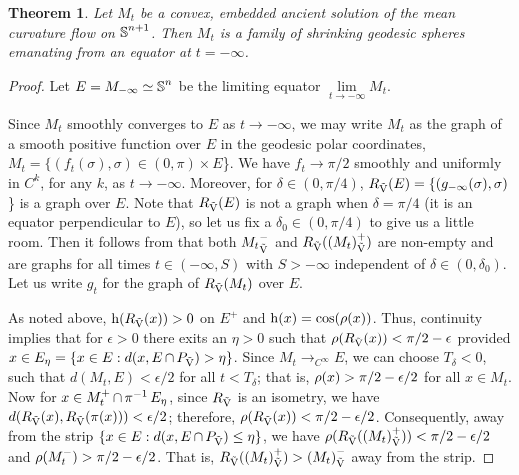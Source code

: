 \documentclass{amsart}
\newtheorem{theorem}{Theorem}
\theoremstyle{definition}
\theoremstyle{remark}
\numberwithin{equation}{section}
\begin{document}
\begin{theorem}
Let \(M_t\) be a convex, embedded ancient solution of the mean curvature flow on \(\operatorname{\mathbb{S}}^{n+1}\). Then \(M_t\) is a family of shrinking geodesic spheres emanating from an equator at \(t=-\infty\).
\end{theorem}
\begin{proof}
Let \(E = M_{-\infty} \simeq \operatorname{\mathbb{S}}^n\) be the limiting equator \(\lim\limits_{t\to-\infty} M_t\).

Since \(M_t\) smoothly converges to \(E\) as \(t\to-\infty\), we may write \(M_t\) as the graph of a smooth positive function over \(E\) in the geodesic polar coordinates, \(M_t = \{(f_t(\sigma), \sigma) \in (0,\pi) \times E\)\}. We have \(f_t \to \pi/2\) smoothly and uniformly in \(C^{k}\), for any $k$, as \(t \to -\infty\). Moreover, for \(\delta \in (0,\pi/4)\), \(R_{\operatorname{\vec{V}}}(E) = \{(g_{-\infty}(\sigma), \sigma)\)\} is a graph over \(E\). Note that \(R_{\operatorname{\vec{V}}}(E)\) is not a graph when \(\delta = \pi/4\) (it is an equator perpendicular to \(E\)), so let us fix a \(\delta_0 \in (0,\pi/4)\) to give us a little room. Then it follows from \cite[Lemma 5.2]{Br-Lou} that both \({M_t}_{\operatorname{\vec{V}}}^-\) and \(R_{\operatorname{\vec{V}}}({(M_t)}_{\operatorname{\vec{V}}}^+)\) are non-empty and are graphs for all times \(t\in(-\infty, S)\) with \(S>-\infty\) independent of \(\delta \in (0, \delta_0)\). Let us write \(g_t\) for the graph of \(R_{\operatorname{\vec{V}}}(M_t)\) over $E$.

As noted above, \(\operatorname{h}(R_{\operatorname{\vec{V}}}(x)) > 0\) on \(E^+\) and \(\operatorname{h}(x) = \cos(\operatorname{\rho}(x))\). Thus, continuity implies that for \(\epsilon > 0\) there exits an \(\eta>0\) such that \(\operatorname{\rho}(R_{\operatorname{\vec{V}}}(x)) < \pi/2 - \epsilon\) provided \(x \in E_{\eta} = \{x \in E: d(x, E \operatorname{\cap} P_{\operatorname{\vec{V}}}) > \eta\}\). Since \(M_t \to_{C^{\infty}} E\), we can choose \(T_{\delta} < 0\), such that \(d(M_t, E) < \epsilon/2\) for all \(t < T_{\delta}\); that is, \(\operatorname{\rho} (x) > \pi/2 - \epsilon/2\) for all \(x \in M_t\). Now for \(x \in M_t^+ \operatorname{\cap} \operatorname{\pi}^{-1} E_{\eta}\), since \(R_{\operatorname{\vec{V}}}\) is an isometry, we have \(d(R_{\operatorname{\vec{V}}}(x), R_{\operatorname{\vec{V}}}(\operatorname{\pi}(x))) < \epsilon/2\); therefore, \(\operatorname{\rho}(R_{\operatorname{\vec{V}}}(x)) < \pi/2 - \epsilon/2\). Consequently, away from the strip \(\{x \in E: d(x, E \operatorname{\cap} P_{\operatorname{\vec{V}}}) \leq \eta\}\), we have \(\operatorname{\rho}(R_{\operatorname{\vec{V}}}({(M_t)}_{\operatorname{\vec{V}}}^+)) < \pi/2 - \epsilon/2\) and \(\operatorname{\rho}(M_t^-) > \pi/2 - \epsilon/2\). That is,  \(R_{\operatorname{\vec{V}}}({(M_t)}_{\operatorname{\vec{V}}}^+) > {(M_t)}_{\operatorname{\vec{V}}}^-\) away from the strip.


\end{proof}
\end{document}
